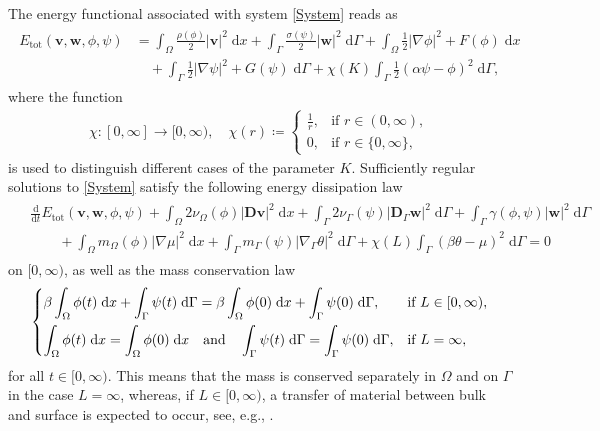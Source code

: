\documentclass[10pt,reqno]{amsart}
\theoremstyle{remark}
\numberwithin{equation}{section}
\newcommand{\abs}[1]{| #1 |}
\newcommand{\bv}{\mathbf{v}}
\newcommand{\bw}{\mathbf{w}}
\newcommand{\D}{\mathbf{D}}
\newcommand{\Dg}{\mathbf{D}_\Gamma}
\newcommand{\intO}{\int_\Omega}
\newcommand{\intG}{\int_\Gamma}
\newcommand{\dx}{\;\mathrm{d}x}
\newcommand{\dG}{\;\mathrm d\Ga}
\newcommand{\ddt}{\frac{\mathrm d}{\mathrm dt}}
\newcommand{\Grad}{\nabla}
\newcommand{\Gradg}{\nabla_\Ga}
\newcommand{\Om}{\Omega}
\newcommand{\Ga}{\Gamma}
\begin{document}
The energy functional associated with system \eqref{System} reads as
\begin{align}\label{Definition:TotalEnergy}
    \begin{split}
        E_{\mathrm{tot}}(\bv,\bw,\phi,\psi) &= \intO \frac{\rho(\phi)}{2}\abs{\bv}^2\dx + \intG \frac{\sigma(\psi)}{2}\abs{\bw}^2\dG + \intO \frac12\abs{\Grad\phi}^2 + F(\phi)\dx \\
        &\quad + \intG \frac12\abs{\Grad\psi}^2 + G(\psi)\dG + \chi(K)\intG \frac12(\alpha\psi - \phi)^2\dG,
    \end{split}
\end{align}
where the function
\begin{align}\label{Definition:chi}
    \chi:[0,\infty]\rightarrow[0,\infty), \quad\chi(r) \coloneqq \begin{cases}
        \tfrac1r, &\text{if~}r\in(0,\infty), \\
        0, &\text{if~} r\in\{0,\infty\},
    \end{cases}
\end{align}
is used to distinguish different cases of the parameter $K$. Sufficiently regular solutions to \eqref{System} satisfy the following energy dissipation law
\begin{align}\label{EnergyDissipation}
    \begin{split}
        &\ddt E_{\mathrm{tot}}(\bv,\bw,\phi,\psi) + \intO 2\nu_\Om(\phi)\abs{\D\bv}^2\dx + \intG 2\nu_\Ga(\psi)\abs{\Dg\bw}^2\dG + \intG \gamma(\phi,\psi)\abs{\bw}^2\dG \\
        &\qquad + \intO m_\Om(\phi)\abs{\Grad\mu}^2\dx + \intG m_\Ga(\psi)\abs{\Gradg\theta}^2\dG + \chi(L)\intG (\beta\theta - \mu)^2\dG = 0 
    \end{split}
\end{align}
on $[0,\infty)$, as well as the mass conservation law
\begin{align}\label{MassConservation}
    \begin{dcases}
        \beta\intO \phi(t)\dx + \intG \psi(t)\dG = \beta\intO \phi(0) \dx + \intG \psi(0)\dG, &\textnormal{if~} L\in[0,\infty), \\
        \intO\phi(t)\dx = \intO\phi(0)\dx \quad\textnormal{and}\quad \intG\psi(t)\dG = \intG\psi(0)\dG, &\textnormal{if~} L = \infty,
    \end{dcases}
\end{align}
for all $t\in[0,\infty)$. This means that the mass is conserved separately in $\Om$ and on $\Ga$ in the case $L = \infty$, whereas, if $L\in[0,\infty)$, a transfer of material between bulk and surface is expected to occur, see, e.g., \cite{Knopf2021a}.
\end{document}
